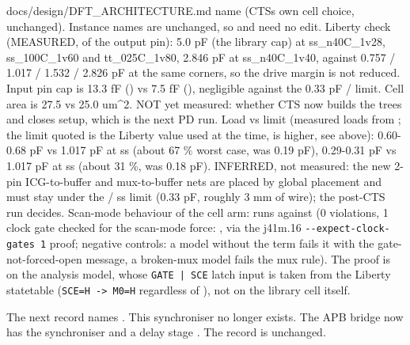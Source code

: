 \begin{relocated}{docs/design/DFT_ARCHITECTURE.md}
name  (CTS\textquotesingle s own cell choice,
unchanged). Instance names are unchanged, so 
and  need no edit. Liberty check
(MEASURED,  of the output pin):  5.0
pF (the library cap) at ss\_\allowbreak{}n40C\_\allowbreak{}1v28,
ss\_\allowbreak{}100C\_\allowbreak{}1v60 and
tt\_\allowbreak{}025C\_\allowbreak{}1v80, 2.846 pF at
ss\_\allowbreak{}n40C\_\allowbreak{}1v40, against  0.757
/ 1.017 / 1.532 / 2.826 pF at the same corners, so the drive margin is
not reduced. Input pin cap is 13.3 fF () vs 7.5 fF
(), negligible against the 0.33 pF
/ limit. Cell area is 27.5 vs 25.0 um\^{}2.
NOT yet measured: whether CTS now builds the trees and closes setup,
which is the next PD run. Load vs limit (measured loads from
; the limit quoted is
the  Liberty value used at the time,  is
higher, see above):  0.60-0.68 pF vs 1.017 pF at ss
(about 67 \% worst case, was 0.19 pF),  0.29-0.31 pF vs
1.017 pF at ss (about 31 \%, was 0.18 pF). INFERRED, not measured: the
new 2-pin ICG-to-buffer and mux-to-buffer nets are placed by global
placement and must stay under the / ss
limit (0.33 pF, roughly 3 mm of wire); the post-CTS run decides.
Scan-mode behaviour of the cell arm:  runs against
 (0 violations, 1 clock gate checked
for the scan-mode force: , via the j41m.16
\texttt{-\allowbreak{}-\allowbreak{}expect-\allowbreak{}clock-\allowbreak{}gates\ 1}
proof; negative controls: a model without the  term fails it
with the gate-not-forced-open message, a broken-mux model fails the mux
rule). The proof is on the analysis model, whose \texttt{GATE\ |\ SCE}
latch input is taken from the Liberty statetable
(\texttt{SCE=\allowbreak{}H\ -\allowbreak{}>\ M0=\allowbreak{}H}
regardless of ), not on the library cell itself.

\begin{information}
The next record names . This synchroniser no longer exists. The APB bridge now has the synchroniser  and a delay stage . The record is unchanged.
\end{information}


\end{relocated}

